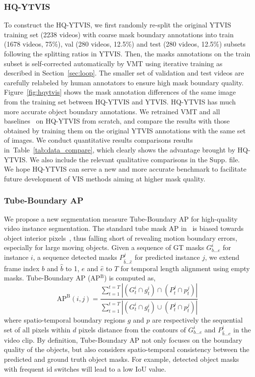 \documentclass[runningheads]{llncs}
\begin{document}
\subsubsection{HQ-YTVIS}To construct the HQ-YTVIS, we first randomly re-split the original YTVIS training set (2238 videos) with coarse mask boundary annotations into train (1678 videos, 75\%), val (280 videos, 12.5\%) and test (280 videos, 12.5\%) subsets following the splitting ratios in YTVIS. 
Then, the masks annotations on the train subset is self-corrected automatically by VMT using iterative training as described in Section~\ref{sec:loop}. The smaller set of validation and test videos are carefully relabeled by human annotators to ensure high mask boundary quality. Figure~\ref{fig:hqytvis} shows the mask annotation differences of the same image from the training set between HQ-YTVIS and YTVIS. HQ-YTVIS has much more accurate object boundary annotations. We retrained VMT and all baselines~\cite{yang2019video, wang2020end, pcan, Yang_2021_ICCV,Fang_2021_ICCV,hwang2021video} on HQ-YTVIS from scratch, and compare the results with those obtained by training them on the original YTVIS annotations with the same set of images. We conduct quantitative results comparisons results in~Table~\ref{tab:data_compare}, which clearly shows the advantage brought by HQ-YTVIS.
We also include the relevant qualitative comparisons in the Supp. file.
We hope HQ-YTVIS can serve a new and more accurate benchmark to facilitate future development of VIS methods aiming at higher mask quality.


\subsubsection{Tube-Boundary AP} 
We propose a new segmentation measure Tube-Boundary AP for high-quality video instance segmentation. The standard tube mask AP in~\cite{yang2019video} is biased towards object interior pixels~\cite{kirillov2020pointrend,cheng2021boundary}, thus falling short of revealing motion boundary errors, especially for large moving objects.
Given a sequence of GT masks $G^{i}_{b...e}$ for instance $i$,  a sequence detected masks $P^{j}_{\hat{b}...\hat{e}}$ for predicted instance $j$, we extend frame index $b$ and $\hat{b}$ to 1, $e$ and $\hat{e}$ to $T$ for temporal length alignment using empty masks. Tube-Boundary AP (AP$^{\text{B}}$) is computed as,
\begin{equation}
    \text{AP}^{\text{B}}(i, j) = \frac{\sum_{t=1}^{t=T} \left | (G^{i}_{t} \cap g^{i}_{t}) \cap (P^{j}_{t} \cap p^{j}_{t}) \right |}{\sum_{t=1}^{t=T} \left | (G^{i}_{t}\cap g^{i}_{t})\cup (P^{j}_{t} \cap p^{j}_{t}) \right |}
\end{equation}
where spatio-temporal boundary regions $g$ and $p$ are respectively the sequential set of all pixels within $d$ pixels distance from the contours of $G^{i}_{b...e}$ and $P^{i}_{\hat{b}...\hat{e}}$ in the video clip.
By definition, Tube-Boundary AP not only focuses on the boundary quality of the objects, but also considers spatio-temporal consistency between the predicted and ground truth object masks. For example, detected object masks with frequent id switches will lead to a low IoU value. 
\end{document}
